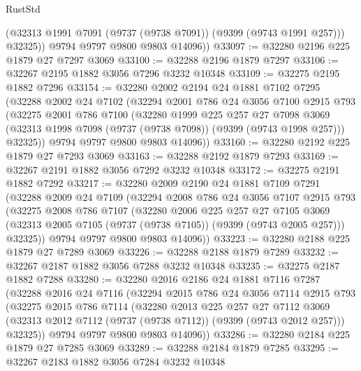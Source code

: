 \begin{lexlean}{RustStd}
\begin{coremodule}
            (@32313 @1991 @7091 (@9737 (@9738 @7091)) (@9399 (@9743 @1991 @257)))
            @32325))
        @9794
        @9797
        @9800
        @9803
        @14096))
@33097 := @32280 @2196 @225 @1879 @27 @7297 @3069
@33100 := @32288 @2196 @1879 @7297
@33106 := @32267 @2195 @1882 @3056 @7296 @3232 @10348
@33109 := @32275 @2195 @1882 @7296
@33154 := @32280
    @2002
    @2194
    @24
    @1881
    @7102
    @7295
    (@32288
      @2002
      @24
      @7102
      (@32294
        @2001
        @786
        @24
        @3056
        @7100
        @2915
        @793
        (@32275
          @2001
          @786
          @7100
          (@32280
            @1999
            @225
            @257
            @27
            @7098
            @3069
            (@32313 @1998 @7098 (@9737 (@9738 @7098)) (@9399 (@9743 @1998 @257)))
            @32325))
        @9794
        @9797
        @9800
        @9803
        @14096))
@33160 := @32280 @2192 @225 @1879 @27 @7293 @3069
@33163 := @32288 @2192 @1879 @7293
@33169 := @32267 @2191 @1882 @3056 @7292 @3232 @10348
@33172 := @32275 @2191 @1882 @7292
@33217 := @32280
    @2009
    @2190
    @24
    @1881
    @7109
    @7291
    (@32288
      @2009
      @24
      @7109
      (@32294
        @2008
        @786
        @24
        @3056
        @7107
        @2915
        @793
        (@32275
          @2008
          @786
          @7107
          (@32280
            @2006
            @225
            @257
            @27
            @7105
            @3069
            (@32313 @2005 @7105 (@9737 (@9738 @7105)) (@9399 (@9743 @2005 @257)))
            @32325))
        @9794
        @9797
        @9800
        @9803
        @14096))
@33223 := @32280 @2188 @225 @1879 @27 @7289 @3069
@33226 := @32288 @2188 @1879 @7289
@33232 := @32267 @2187 @1882 @3056 @7288 @3232 @10348
@33235 := @32275 @2187 @1882 @7288
@33280 := @32280
    @2016
    @2186
    @24
    @1881
    @7116
    @7287
    (@32288
      @2016
      @24
      @7116
      (@32294
        @2015
        @786
        @24
        @3056
        @7114
        @2915
        @793
        (@32275
          @2015
          @786
          @7114
          (@32280
            @2013
            @225
            @257
            @27
            @7112
            @3069
            (@32313 @2012 @7112 (@9737 (@9738 @7112)) (@9399 (@9743 @2012 @257)))
            @32325))
        @9794
        @9797
        @9800
        @9803
        @14096))
@33286 := @32280 @2184 @225 @1879 @27 @7285 @3069
@33289 := @32288 @2184 @1879 @7285
@33295 := @32267 @2183 @1882 @3056 @7284 @3232 @10348

\end{coremodule}
\end{lexlean}
